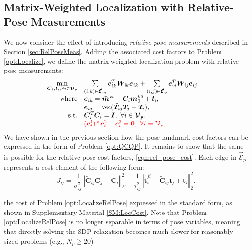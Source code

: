 \documentclass[lettersize,journal]{IEEEtran}
\newcommand{\EdgeSet}{\vec{\bm{\mathcal{E}}}}
\newcommand{\VertSetP}{\bm{\mathcal{V}}_p}
\newcommand{\vect}[1]{\mbox{vec}(#1)}
\newcommand{\rev}[1]{\color{red}{#1}\color{black}}
\begin{document}
\subsection{Matrix-Weighted Localization with Relative-Pose Measurements}\label{sec:LocRelPose}

We now consider the effect of introducing \textit{relative-pose measurements} described in Section \ref{sec:RelPoseMeas}. Adding the associated cost factors to Problem \eqref{opt:Localize}, we define the matrix-weighted localization problem with relative-pose measurements:
\begin{equation}
	\label{opt:LocalizeRelPose}
	\hspace*{-10pt}\begin{array}{rl}
		\min\limits_{\bm{C}_i,\bm{t}_i, \forall  i \in \VertSetP} &\sum\limits_{(i,k)\in\EdgeSet_m} \bm{e}_{ik}^T \bm{W}_{ik} \bm{e}_{ik} +\sum\limits_{(i,j)\in\EdgeSet_p}  \bm{e}_{ij}^T \bm{W}_{ij} \bm{e}_{ij}\\
		\mbox{where} & \bm{e}_{ik} = \tilde{\bm{m}}_i^{ki} - \bm{C}_i\bm{m}_0^{k0} + \bm{t}_i , \\
		&\bm{e}_{ij} = \vect{\tilde{\bm{T}}_{ij}\bm{T}_j - \bm{T}_i}, \\
		\mbox{s.t.} &\bm{C}_i^T \bm{C}_i = \bm{I},~\forall i \in \VertSetP. \\
		& \rev{(\bm{c}_i^{1})^\times\bm{c}_i^{2} - \bm{c}_i^{3} = \bm{0},~\forall i = \VertSetP, }
	\end{array}
\end{equation}
We have shown in the previous section how the pose-landmark cost factors can be expressed in the form of Problem \eqref{opt:QCQP}. It remains to show that the same is possible for the relative-pose cost factors, \eqref{eqn:rel_pose_cost}. Each edge in $\EdgeSet_p$ represents a cost element of the following form:
\begin{equation}
	J_{ij} = \frac{1}{\sigma^2_{ij}} \left\Vert \tilde{\bm{C}}_{ij}\bm{C}_j - \bm{C}_i\right\Vert_F^2 + \frac{1}{\tau^2_{ij}} \left\Vert \tilde{\bm{t}}^{ji}_{i} - \tilde{\bm{C}}_{ij}\bm{t}_j + \bm{t}_i \right\Vert_2^2.
\end{equation}

\rev{Each element of }the cost of Problem \eqref{opt:LocalizeRelPose} \rev{is clearly a quadratic function in the optimization variables and can be }expressed in the standard \rev{homogeneous QCQP } form, as shown in Supplementary Material \ref{SM:LocCost}. Note that Problem \eqref{opt:LocalizeRelPose} is no longer separable in terms of pose variables, meaning that directly solving the SDP relaxation becomes much slower for reasonably sized problems (e.g., $N_p \geq 20$). 
\end{document}
